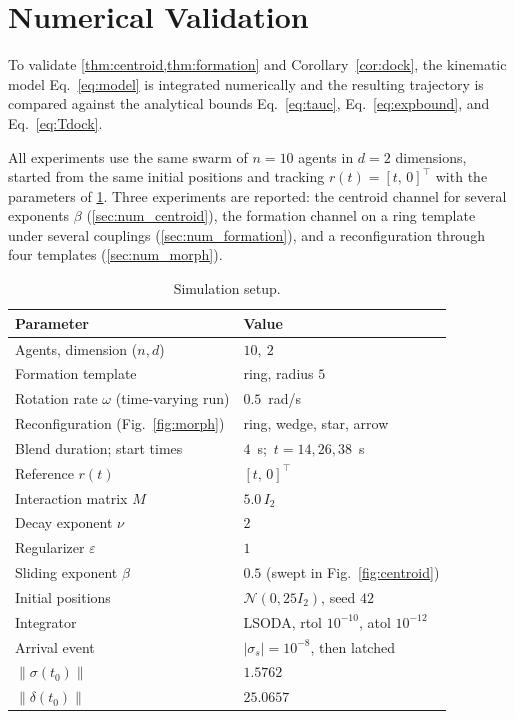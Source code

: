 \documentclass[letterpaper, 10 pt, conference]{ieeeconf}
\newcommand{\norm}[1]{\left\lVert #1 \right\rVert}
\newcommand{\abs}[1]{\left\lvert #1 \right\rvert}
\begin{document}
\section{Numerical Validation}
\label{sec:numerics}

To validate \cref{thm:centroid,thm:formation}
and Corollary~\ref{cor:dock}, the kinematic model Eq.~\eqref{eq:model} is
integrated numerically and the resulting trajectory is compared
against the analytical bounds Eq.~\eqref{eq:tauc}, Eq.~\eqref{eq:expbound},
and Eq.~\eqref{eq:Tdock}.

All experiments use the same swarm of $n=10$ agents in $d=2$
dimensions, started from the same initial positions and tracking
$r(t)=[t,\,0]^\top$ with the parameters of \cref{tab:params}. Three
experiments are reported: the centroid channel for several exponents
$\beta$ (\cref{sec:num_centroid}), the formation channel on a ring
template under several couplings (\cref{sec:num_formation}), and a
reconfiguration through four templates (\cref{sec:num_morph}).


\begin{table}[t]
\centering
\caption{Simulation setup.}
\label{tab:params}
\begin{tabular}{@{}ll@{}}
\toprule
Parameter & Value \\
\midrule
Agents, dimension ($n,d$) & $10,\ 2$ \\
Formation template & ring, radius $5$ \\
Rotation rate $\omega$ (time-varying run) & $0.5$~rad/s \\
Reconfiguration (Fig.~\ref{fig:morph}) & ring, wedge, star, arrow \\
Blend duration; start times & $4$~s;\ $t=14,26,38$~s \\
Reference $r(t)$ & $[t,\,0]^\top$ \\
Interaction matrix $M$ & $5.0\,I_2$ \\
Decay exponent $\nu$ & $2$ \\
Regularizer $\varepsilon$ & $1$ \\
Sliding exponent $\beta$ & $0.5$ (swept in Fig.~\ref{fig:centroid}) \\
Initial positions & $\mathcal N(0,25I_2)$, seed $42$ \\
Integrator & LSODA, rtol $10^{-10}$, atol $10^{-12}$ \\
Arrival event & $\abs{\sigma_s}=10^{-8}$, then latched \\
$\norm{\sigma(t_0)}$ & $1.5762$ \\
$\norm{\delta(t_0)}$ & $25.0657$ \\
\bottomrule
\end{tabular}
\end{table}
\end{document}
